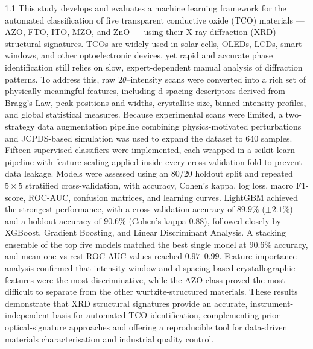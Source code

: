 \documentclass[12pt, oneside]{article} %
\begin{document}
\vspace{1cm}

\begin{spacing}{1.1}
This study develops and evaluates a machine learning framework for the automated classification of five transparent conductive oxide (TCO) materials --- AZO, FTO, ITO, MZO, and ZnO --- using their X-ray diffraction (XRD) structural signatures. TCOs are widely used in solar cells, OLEDs, LCDs, smart windows, and other optoelectronic devices, yet rapid and accurate phase identification still relies on slow, expert-dependent manual analysis of diffraction patterns. To address this, raw $2\theta$--intensity scans were converted into a rich set of physically meaningful features, including d-spacing descriptors derived from Bragg's Law, peak positions and widths, crystallite size, binned intensity profiles, and global statistical measures. Because experimental scans were limited, a two-strategy data augmentation pipeline combining physics-motivated perturbations and JCPDS-based simulation was used to expand the dataset to 640 samples. Fifteen supervised classifiers were implemented, each wrapped in a scikit-learn pipeline with feature scaling applied inside every cross-validation fold to prevent data leakage. Models were assessed using an 80/20 holdout split and repeated $5 \times 5$ stratified cross-validation, with accuracy, Cohen's kappa, log loss, macro F1-score, ROC-AUC, confusion matrices, and learning curves. LightGBM achieved the strongest performance, with a cross-validation accuracy of $89.9\%$ ($\pm 2.1\%$) and a holdout accuracy of $90.6\%$ (Cohen's kappa $0.88$), followed closely by XGBoost, Gradient Boosting, and Linear Discriminant Analysis. A stacking ensemble of the top five models matched the best single model at $90.6\%$ accuracy, and mean one-vs-rest ROC-AUC values reached $0.97$--$0.99$. Feature importance analysis confirmed that intensity-window and d-spacing-based crystallographic features were the most discriminative, while the AZO class proved the most difficult to separate from the other wurtzite-structured materials. These results demonstrate that XRD structural signatures provide an accurate, instrument-independent basis for automated TCO identification, complementing prior optical-signature approaches and offering a reproducible tool for data-driven materials characterisation and industrial quality control.
\end{spacing}

\vfill \null

\newpage
\end{document}
